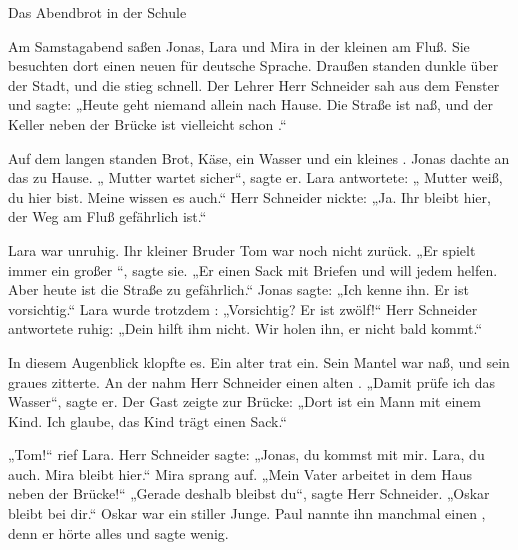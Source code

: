 \documentclass[12pt]{nextbook}
\begin{document}
\begin{readersection}{Das Abendbrot in der Schule}

Am Samstagabend saßen Jonas, Lara und Mira in der kleinen  am Fluß. Sie besuchten dort einen neuen  für deutsche Sprache. Draußen standen dunkle  über der Stadt, und die  stieg schnell. Der Lehrer Herr Schneider sah aus dem Fenster und sagte: „Heute geht niemand allein nach Hause. Die Straße ist naß, und der Keller neben der Brücke ist vielleicht schon .“

Auf dem langen  standen Brot, Käse, ein  Wasser und ein kleines . Jonas dachte an das  zu Hause. „ Mutter wartet sicher“, sagte er. Lara antwortete: „ Mutter weiß,  du hier bist. Meine  wissen es auch.“ Herr Schneider nickte: „Ja. Ihr bleibt hier,  der Weg am Fluß gefährlich ist.“

Lara war unruhig. Ihr kleiner Bruder Tom war noch nicht zurück. „Er spielt immer  ein großer “, sagte sie. „Er  einen Sack mit Briefen und will jedem helfen. Aber heute ist die Straße zu gefährlich.“ Jonas sagte: „Ich kenne ihn. Er ist vorsichtig.“ Lara wurde trotzdem : „Vorsichtig? Er ist zwölf!“ Herr Schneider antwortete ruhig: „Dein  hilft ihm nicht. Wir holen ihn,  er nicht bald kommt.“

In diesem Augenblick klopfte es. Ein alter  trat ein. Sein Mantel war naß, und sein graues  zitterte. An der  nahm Herr Schneider einen alten . „Damit prüfe ich das Wasser“, sagte er. Der Gast zeigte zur Brücke: „Dort ist ein Mann mit einem Kind. Ich glaube, das Kind trägt einen Sack.“

„Tom!“ rief Lara. Herr Schneider sagte: „Jonas, du kommst mit mir. Lara, du auch. Mira bleibt hier.“ Mira sprang auf. „Mein Vater arbeitet in dem Haus neben der Brücke!“ „Gerade deshalb bleibst du“, sagte Herr Schneider. „Oskar bleibt bei dir.“ Oskar war ein stiller Junge. Paul nannte ihn manchmal einen , denn er hörte alles und sagte wenig.


\end{readersection}
\end{document}
